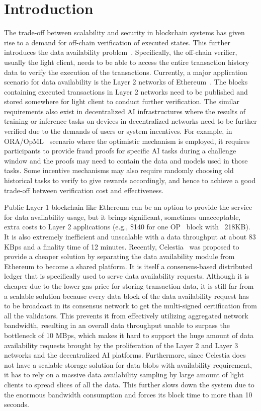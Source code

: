 \section{Introduction}

The trade-off between scalability and security in blockchain systems has given rise to a demand for off-chain verification of executed states. This further introduces the data availability problem~\cite{da}. Specifically, the off-chain verifier, usually the light client, needs to be able to access the entire transaction history data to verify the execution of the transactions. 
Currently, a major application scenario for data availability is the Layer 2 networks of Ethereum~\cite{Ethereum}. The blocks containing executed transactions in Layer 2 networks need to be published and stored somewhere for light client to conduct further verification. The similar requirements also exist in decentralized AI infrastructures where the results of training or inference tasks on devices in decentralized networks need to be further verified due to the demands of users or system incentives. 
For example, in ORA/OpML~\cite{opml} scenario where the optimistic mechanism is employed, it requires participants to provide fraud proofs for specific AI tasks during a challenge window and the proofs may need to contain the data and models used in those tasks. 
Some incentive mechanisms may also require randomly choosing old historical tasks to verify to give rewards accordingly, and hence to achieve a good trade-off between verification cost and effectiveness. 

Public Layer 1 blockchain like Ethereum can be an option to provide the service for data availability usage, but it brings significant, sometimes unacceptable, extra costs to Layer 2 applications (e.g., \$140 for one OP~\cite{op} block with ~218KB). It is also extremely inefficient and unscalable with a data throughput at about 83 KBps and a finality time of 12 minutes. Recently, Celestia~\cite{celestia} was proposed to provide a cheaper solution by separating the data availability module from Ethereum to become a shared platform. It is itself a consensus-based distributed ledger that is specifically used to serve data availability requests. Although it is cheaper due to the lower gas price for storing transaction data, it is still far from a scalable solution because every data block of the data availability request has to be broadcast in its consensus network to get the multi-signed certification from all the validators. This prevents it from effectively utilizing aggregated network bandwidth, resulting in an overall data throughput unable to surpass the bottleneck of 10 MBps, which makes it hard to support the huge amount of data availability requests brought by the proliferation of the Layer 2 and Layer 3 networks and the decentralized AI platforms. 
Furthermore, since Celestia does not have a scalable storage solution for data blobs with availability requirement, it has to rely on a massive data availability sampling by large amount of light clients to spread slices of all the data. This further slows down the system due to the enormous bandwidth consumption and forces its block time to more than 10 seconds. 

